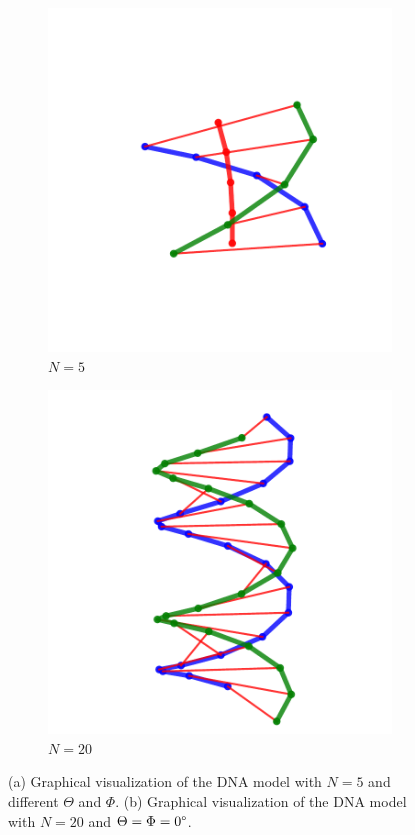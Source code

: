 \documentclass[a4paper,10pt]{article}
\begin{document}
\begin{figure}[tb]
\centering
\begin{subfigure}{.4\textwidth}
\includegraphics[width=\textwidth]{main_5.pdf}
\caption{$N=5$}
\label{fig:model_a}
\end{subfigure}
\begin{subfigure}{.4\textwidth}
\includegraphics[width=\textwidth]{main_20.pdf}
\caption{$N=20$}
\label{fig:model_b}
\end{subfigure}
\caption{(a) Graphical visualization of the DNA model with $N=5$ and different $\Theta$ and $\Phi$. (b) Graphical visualization of the DNA model with $N=20$ and $\Theta=\Phi=0\degree$.}
\label{fig:model}
\end{figure}
\end{document}
